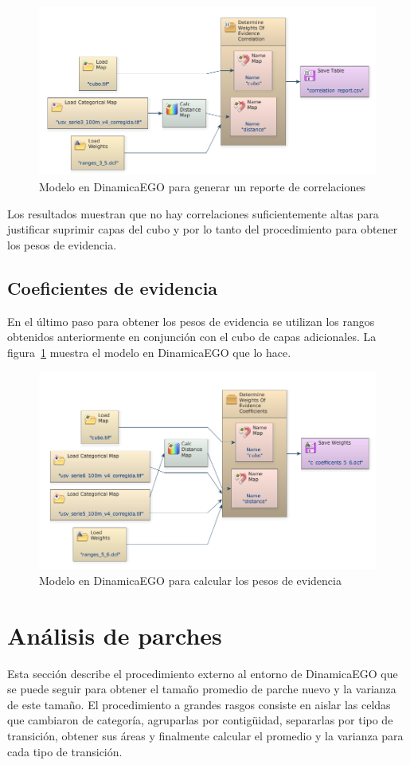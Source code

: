\documentclass[12pt,a4paper,oldfontcommands]{article}
\begin{document}
\begin{figure}[H]
	\centering
	\includegraphics[width=1\textwidth]{./figuras/correlacion.png}
	\caption{Modelo en DinamicaEGO para generar un reporte de correlaciones}
\end{figure}
Los resultados muestran que no hay correlaciones suficientemente altas para justificar suprimir capas del cubo y por lo tanto del procedimiento para obtener los pesos de evidencia.
\subsection{Coeficientes de evidencia}
En el último paso para obtener los pesos de evidencia se utilizan los rangos obtenidos anteriormente en conjunción con el cubo de capas adicionales. La figura~\ref{fig:evidence} muestra el modelo en DinamicaEGO que lo hace.
\begin{figure}[h]
	\centering
	\includegraphics[width=1\textwidth]{./figuras/evidence.png}
	\caption{Modelo en DinamicaEGO para calcular los pesos de evidencia}
	\label{fig:evidence}
\end{figure}
\section{Análisis de parches}
Esta sección describe el procedimiento externo al entorno de DinamicaEGO que se puede seguir para obtener el tamaño promedio de parche nuevo y la varianza de este tamaño. El procedimiento a grandes rasgos consiste en aislar las celdas que cambiaron de categoría, agruparlas por contigüidad, separarlas por tipo de transición, obtener sus áreas y finalmente calcular el promedio y la varianza para cada tipo de transición.
\end{document}
